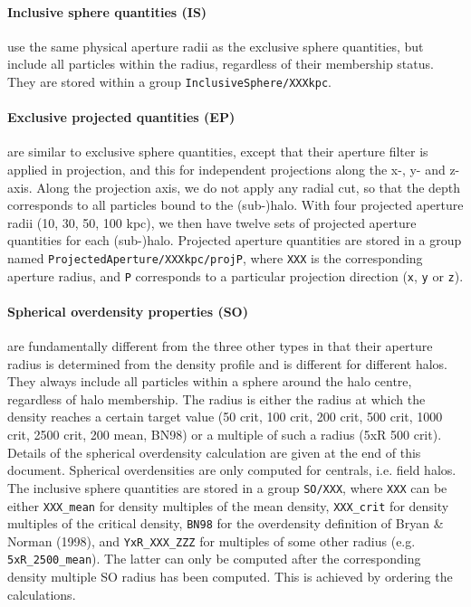\documentclass{article}
\begin{document}
\paragraph{Inclusive sphere quantities (IS)} use the same physical aperture radii as the exclusive sphere 
quantities, but include all particles within the radius, regardless of their membership status. They are
stored within a group \verb+InclusiveSphere/XXXkpc+.

\paragraph{Exclusive projected quantities (EP)} are similar to exclusive sphere quantities, except that their 
aperture filter is applied in projection, and this for independent projections along the x-, y- and z-axis. 
Along the projection axis, we do not apply any radial cut, so that the depth corresponds to all particles 
bound to the (sub-)halo. With four projected aperture radii (10, 30, 50, 100 kpc), we then have twelve sets of 
projected aperture quantities for each (sub-)halo. Projected aperture quantities are stored in a group named 
\verb+ProjectedAperture/XXXkpc/projP+, where \verb+XXX+ is the corresponding aperture radius, and \verb+P+ 
corresponds to a particular projection direction (\verb+x+, \verb+y+ or \verb+z+).

\paragraph{Spherical overdensity properties (SO)} are fundamentally different from the three other types in 
that their aperture radius is determined from the density profile and is different for different halos. They 
always include all particles within a sphere around the halo centre, regardless of halo membership. 
The radius is either the radius at which the density reaches a certain target value (50 crit, 100 crit, 200 
crit, 500 crit, 1000 crit, 2500 crit, 200 mean, BN98) or a multiple of such a radius (5xR 500 crit). Details 
of the spherical overdensity calculation are given at the end of this document. Spherical overdensities are 
only computed for centrals, i.e. field halos. The inclusive sphere quantities are stored in a group 
\verb+SO/XXX+, where \verb+XXX+ can be either \verb+XXX_mean+ for density multiples of the mean density, 
\verb+XXX_crit+ for density multiples of the critical density, \verb+BN98+ for the overdensity definition of 
Bryan \& Norman (1998), and \verb+YxR_XXX_ZZZ+ for multiples of some other radius (e.g. \verb+5xR_2500_mean+). 
The latter can only be computed after the corresponding density multiple SO radius has been computed. This is 
achieved by ordering the calculations.
\end{document}
